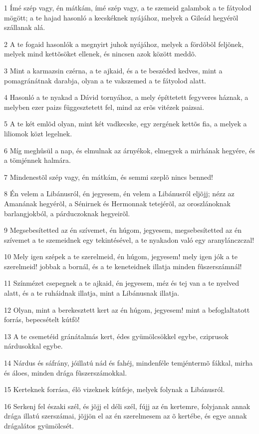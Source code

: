 \par 1 Ímé szép vagy, én mátkám, ímé szép vagy, a te szemeid galambok a te fátyolod mögött; a te  hajad hasonló a kecskéknek nyájához, melyek a Gileád hegyérõl szállanak alá.
\par 2 A te fogaid hasonlók a megnyirt juhok nyájához, melyek a fördõbõl feljõnek, melyek mind kettõsöket ellenek, és nincsen azok között meddõ.
\par 3 Mint a karmazsin czérna, a te ajkaid, és a te beszéded kedves, mint a pomagránátnak darabja, olyan a te vakszemed a te fátyolod alatt.
\par 4 Hasonló a te nyakad a Dávid tornyához, a mely építtetett fegyveres háznak, a melyben ezer paizs függesztetett fel, mind az erõs vitézek paizsai.
\par 5 A te két emlõd olyan, mint két vadkecske, egy zergének kettõs fia, a melyek a liliomok közt legelnek.
\par 6 Míg meghûsül a nap, és elmulnak az árnyékok, elmegyek a mirhának hegyére, és a tömjénnek halmára.
\par 7 Mindenestõl szép vagy, én mátkám, és semmi szeplõ nincs benned!
\par 8 Én velem a Libánusról, én jegyesem, én velem a Libánusról eljõjj; nézz az Amanának hegyérõl, a Sénirnek és Hermonnak tetejérõl, az oroszlánoknak barlangjokból, a párduczoknak hegyeirõl.
\par 9 Megsebesítetted az én szívemet, én húgom, jegyesem, megsebesítetted az én szívemet a te szemeidnek egy tekintésével, a te nyakadon való egy aranylánczczal!
\par 10 Mely igen szépek a te szerelmeid, én húgom, jegyesem! mely igen jók a te szerelmeid! jobbak a bornál, és a te keneteidnek illatja minden fûszerszámnál!
\par 11 Színmézet csepegnek a te ajkaid, én jegyesem, méz és tej van a te nyelved alatt, és a te ruháidnak illatja, mint a Libánusnak illatja.
\par 12 Olyan, mint a berekesztett kert az én húgom, jegyesem! mint a befoglaltatott forrás, bepecsételt kútfõ!
\par 13 A te csemetéid gránátalmás kert, édes gyümölcsökkel egybe, cziprusok nárdusokkal egybe.
\par 14 Nárdus és sáfrány, jóillatú nád és fahéj, mindenféle temjéntermõ fákkal, mirha és áloes, minden drága fûszerszámokkal.
\par 15 Kerteknek forrása, élõ vizeknek kútfeje, melyek folynak a Libánusról.
\par 16 Serkenj fel északi szél, és jõjj el déli szél, fújj az én kertemre, folyjanak annak drága illatú szerszámai, jõjjön el az én szerelmesem az õ kertébe, és egye annak drágalátos gyümölcsét.

